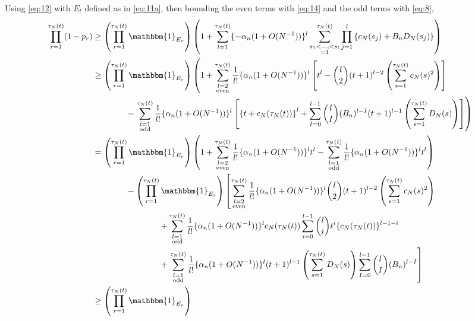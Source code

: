 \documentclass{article}
\newcommand{\1}[1]{\mathbbm{1}_{#1}}
\begin{document}
Using \eqref{eq:12} with $E_t$ defined as in \eqref{eq:11a}, then bounding the even terms with \eqref{eq:14} and the odd terms with \eqref{eq:8},
\begin{align}
\prod_{r=1}^{\tau_N(t)} (1-p_r)
&\geq \left( \prod_{r=1}^{\tau_N(t)} \1{E_r} \right)
\left( 1+ \sum_{l=1}^{\tau_N(t)} \{-\alpha_n (1+O(N^{-1}))\}^l
\sum_{\substack{s_1<\dots,<s_l \\ =1}}^{\tau_N(t)} \prod_{j=1}^l
\left\{ c_N(s_j) + B_n D_N(s_j) \right\} \right) \notag\\
&\geq \left( \prod_{r=1}^{\tau_N(t)} \1{E_r} \right)
\left( 1+ \sum_{\substack{l=2\\ \text{even}}}^{\tau_N(t)} \frac{1}{l!} \{\alpha_n(1+O(N^{-1}))\}^l 
\left[ t^l - \binom{l}{2} (t+1)^{l-2} \left(\sum_{s=1}^{\tau_N(t)} c_N(s)^2 \right) \right] \right.\notag\\
&\qquad\qquad- \left. \sum_{\substack{l=1\\ \text{odd}}}^{\tau_N(t)} \frac{1}{l!} \{\alpha_n(1+O(N^{-1}))\}^l
\left[ \left\{ t+ c_N(\tau_N(t)) \right\}^l 
+ \sum_{I=0}^{l-1} \binom{l}{I} (B_n)^{l-I} (t+1)^{l-1}
\left(\sum_{s=1}^{\tau_N(t)} D_N(s) \right) \right] \right) \notag\\
&= \left( \prod_{r=1}^{\tau_N(t)} \1{E_r} \right)
\left( 1+ \sum_{\substack{l=2\\ \text{even}}}^{\tau_N(t)} \frac{1}{l!} \{\alpha_n(1+O(N^{-1}))\}^l t^l - \sum_{\substack{l=1\\ \text{odd}}}^{\tau_N(t)} \frac{1}{l!} \{\alpha_n(1+O(N^{-1}))\}^l t^l \right) \notag\\
&\qquad\qquad- \left( \prod_{r=1}^{\tau_N(t)} \1{E_r} \right)
\left[ \sum_{\substack{l=2\\ \text{even}}}^{\tau_N(t)} \frac{1}{l!} \{\alpha_n(1+O(N^{-1}))\}^l \binom{l}{2} (t+1)^{l-2}
\left(\sum_{s=1}^{\tau_N(t)} c_N(s)^2 \right) \right. \notag\\
&\qquad\qquad\qquad\qquad+ \sum_{\substack{l=1\\ \text{odd}}}^{\tau_N(t)} \frac{1}{l!} \{\alpha_n(1+O(N^{-1}))\}^l c_N(\tau_N(t))
\sum_{i=0}^{l-1} \binom{l}{i} t^i \{ c_N(\tau_N(t)) \}^{l-1-i} \notag\\
&\qquad\qquad\qquad\qquad+ \left. \sum_{\substack{l=1\\ \text{odd}}}^{\tau_N(t)} \frac{1}{l!} \{\alpha_n(1+O(N^{-1}))\}^l (t+1)^{l-1}
\left(\sum_{s=1}^{\tau_N(t)} D_N(s) \right)
\sum_{I=0}^{l-1} \binom{l}{I} (B_n)^{l-I} \right] \notag\\
&\geq \left( \prod_{r=1}^{\tau_N(t)} \1{E_r} \right)

\end{align}
\end{document}
